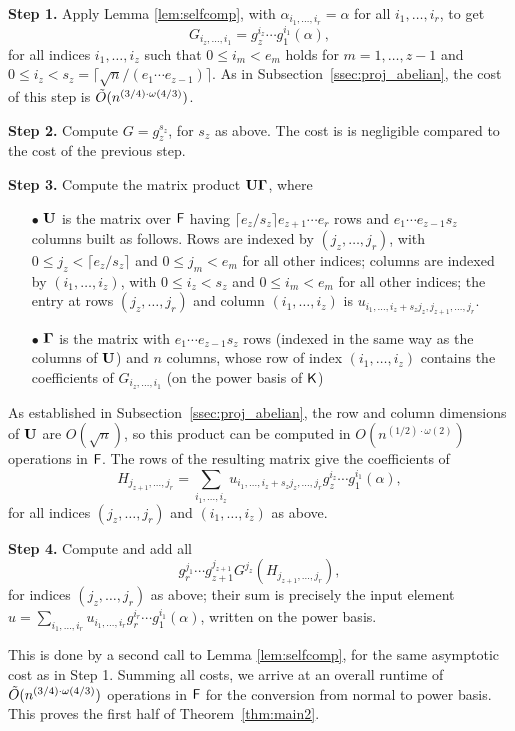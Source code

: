 \smallskip\noindent \textbf{Step 1.} Apply Lemma \ref{lem:selfcomp},
with $\alpha_{i_1,\dots,i_r} = \alpha$ for all $i_1,\dots,i_r$, to get
$$ G_{i_z,\dots,i_1}=g_z^{i_z} \cdots
g_1^{i_1}(\alpha),$$ for all indices $i_1,\dots,i_z$ such that $0\leq
i_m < e_m$ holds for $m=1,\dots,z-1$ and $0\leq i_z <s_z=
\lceil{\sqrt{n}}/(e_1 \cdots e_{z-1})\rceil$.  As in
Subsection~\ref{ssec:proj_abelian}, the cost of this step is
$\tilde{O}(n^{(3/4)\cdot \omega(4/3)})$.

\smallskip\noindent\textbf{Step 2.} Compute $G=g_z^{s_z}$, for $s_z$
as above. The cost is is negligible compared to the cost of the
previous step.

\smallskip\noindent\textbf{Step 3.} Compute the matrix product 
$\mat U \mat \Gamma$, where
\begin{itemize}
\item[$\bullet$] $\mat U$ is the matrix over ${\mathsf{F}}$ having $\lceil
  e_z/s_z\rceil e_{z+1} \cdots e_r$ rows and $e_1 \cdots e_{z-1} s_z$
  columns built as follows. Rows are indexed by $(j_z,\dots,j_r)$,
  with $0\le j_z < \lceil e_z/s_z\rceil$ and $0 \le j_m < e_m$ for all
  other indices; columns are indexed by $(i_1,\dots,i_z)$, with $0\le
  i_z < s_z$ and $0 \le i_m < e_m$ for all other indices; the entry at
  rows $(j_z,\dots,j_r)$ and column $(i_1,\dots,i_z)$ is
  $u_{i_1,\dots,i_z + s_z j_z, j_{z+1},\dots,j_r}$.
\item[$\bullet$] $\mat \Gamma$ is the matrix with $e_1 \cdots e_{z-1}
  s_z$ rows (indexed in the same way as the columns of $\mat U$) and $n$
  columns, whose row of index $(i_1,\dots,i_z)$ contains the
  coefficients of $ G_{i_z,\dots,i_1}$ (on the power basis of ${\mathsf{K}}$)
\end{itemize}
As established in Subsection~\ref{ssec:proj_abelian}, the row and column
dimensions of $\mat U$ are $O(\sqrt n)$, so this product can 
be computed in $O(n^{(1/2)\cdot\omega(2)})$ operations in ${\mathsf{F}}$. The rows of 
the resulting matrix give the coefficients of 
$$ H_{j_{z+1},\dots,j_r} = \sum_{i_1,\dots,i_z} u_{i_1,\dots,i_z+s_z j_z,\dots,j_r} g_z^{i_z} \cdots
g_1^{i_1}(\alpha),$$
for all indices $(j_z,\dots,j_r)$ and $(i_1,\dots,i_z)$ as above.

\smallskip\noindent\textbf{Step 4.} Compute and add all
$$g_r^{j_1} \cdots g_{z+1}^{j_{z+1}} G^{j_z} ( H_{j_{z+1},\dots,j_r}
),$$ for indices $(j_z,\dots,j_r)$ as above; their sum is precisely
the input element $u=\sum_{i_1,\dots,i_r} u_{i_1,\dots,i_r} g_r^{i_r}
\cdots g_1^{i_1}(\alpha)$, written on the power basis.

This is done by a second call to Lemma \ref{lem:selfcomp}, for the same
asymptotic cost as in Step 1. Summing all costs, we arrive
at an overall runtime of $\tilde{O}(n^{(3/4)\cdot \omega(4/3)})$ operations in ${\mathsf{F}}$ for
the conversion from normal to power basis. This proves the first 
half of Theorem~\ref{thm:main2}.

